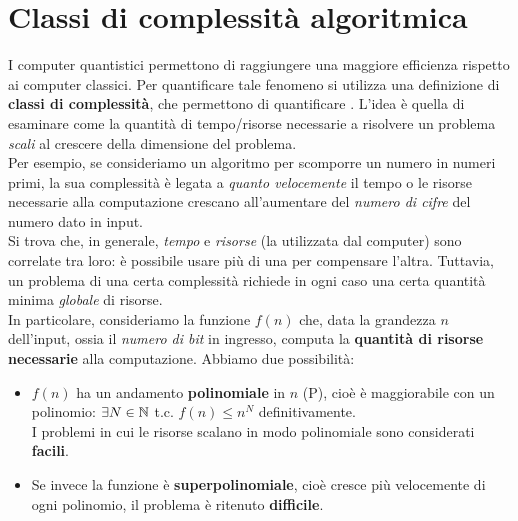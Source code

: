 \documentclass[../../InformazioneQuantistica.tex]{subfiles}
\begin{document}
\section{Classi di complessità algoritmica}
I computer quantistici permettono di raggiungere una maggiore efficienza rispetto ai computer classici. Per quantificare tale fenomeno si utilizza una definizione di \textbf{classi di complessità}, che permettono di quantificare . L'idea è quella di esaminare come la quantità di tempo/risorse necessarie a risolvere un problema \textit{scali} al crescere della dimensione del problema.\\
Per esempio, se consideriamo un algoritmo per scomporre un numero in numeri primi, la sua complessità è legata a \textit{quanto velocemente} il tempo o le risorse necessarie alla computazione crescano all'aumentare del \textit{numero di cifre} del numero dato in input.\\
Si trova che, in generale, \textit{tempo} e \textit{risorse} (la  utilizzata dal computer) sono correlate tra loro: è possibile usare più di una per compensare l'altra. Tuttavia, un problema di una certa complessità richiede in ogni caso una certa quantità minima \textit{globale} di risorse.\\

In particolare, consideriamo la funzione $f(n)$ che, data la grandezza $n$ dell'input, ossia il \textit{numero di bit} in ingresso, computa la \textbf{quantità di risorse necessarie} alla computazione. Abbiamo due possibilità:
\begin{itemize}
\item $f(n)$ ha un andamento \textbf{polinomiale} in $n$ (P), cioè è maggiorabile con un polinomio: $\exists N\in \mathbb{N}$ t.c. $f(n) \leq n^N$ definitivamente.\\
I problemi in cui le risorse scalano in modo polinomiale sono considerati \textbf{facili}.
\item Se invece la funzione è \textbf{superpolinomiale}, cioè cresce più velocemente di ogni polinomio, il problema è ritenuto \textbf{difficile}.
\end{itemize}
\end{document}
